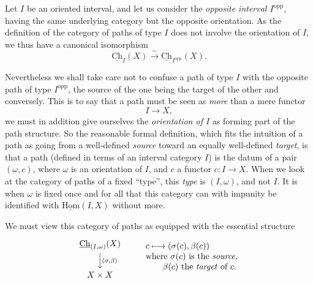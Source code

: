 \documentclass[11pt]{article}
\newcommand{\printedpage}[1]{\marginpar{\footnotesize p.~#1}}
\newcommand{\msp}[1]{\marginpar{\footnotesize [#1]}}
\newcommand{\Ch}{\underline{\mathrm{Ch}}}
\newcommand{\uHom}{\underline{\mathrm{Hom}}}
\newcommand{\opp}{\mathrm{opp}}
\begin{document}
Let $I$ be an oriented interval, and let us consider the \textit{opposite interval $I^{\opp}$}, having the same underlying category but the opposite orientation. As the definition of the category of paths of type $I$ does not involve the orientation of $I$, we thus have a canonical isomorphism %
\[
\Ch_I(X) \xrightarrow{\sim} \Ch_{I^{\opp}}(X).
\]

\msp{page 17}

Nevertheless we shall take care not to confuse a path of type $I$ with the opposite path of type $I^{\opp}$, the source of the one being the target of the other and conversely. This is to say that a path must be seen as \textit{more} than a mere functor
\[
I \longrightarrow X,
\]
we must in addition give ourselves the \textit{orientation of $I$} as forming part of the path structure. So the reasonable formal definition, which fits the intuition of a path as going from a well-defined \textit{source} toward an equally well-defined \textit{target}, is that a path (defined in terms of an interval category $I$) is the datum of a pair $(\omega,c)$, where $\omega$ is an orientation of $I$, and $c$ a functor $c : I \longrightarrow X$. When we look at the category of paths of a fixed ``type'', this \textit{type} is $(I,\omega)$, and not $I$. It is when $\omega$ is fixed once and for all that this category can with impunity be identified with $\uHom(I,X)$ without more. %

We must view this category of paths as equipped with the essential structure
\[
\begin{tikzcd}
\Ch_{(I,\omega)}(X) \arrow[d, "{(\sigma,\beta)}"] \\
X \times X
\end{tikzcd}
\qquad
\begin{array}{l}
c \longmapsto (\sigma(c),\beta(c)) \\
\text{where $\sigma(c)$ is the \textit{source,}} \\
\qquad \text{$\beta(c)$ the \textit{target} of $c$.}
\end{array} %
\]

\printedpage{12}

\msp{page 18}
\end{document}
